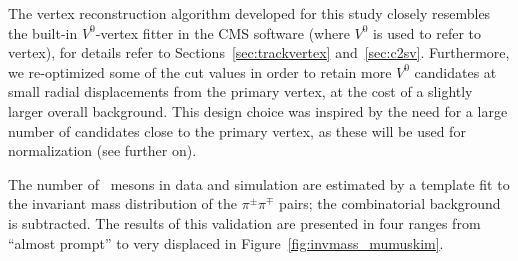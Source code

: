 The vertex reconstruction algorithm developed for this study closely
resembles the built-in $V^0$-vertex fitter in the CMS software (where
$V^0$ is used to refer to \PKzS vertex), for details refer to
Sections~\ref{sec:trackvertex} and~\ref{sec:c2sv}.
Furthermore, we re-optimized some of the cut
values in order to retain more $V^0$ candidates at small radial
displacements from the primary vertex, at the cost of a slightly
larger overall background. This design choice was inspired by the need
for a large number of candidates close to the primary vertex, as these
will be used for normalization (see further on). 

The number of \PKzS~mesons in data and simulation
are estimated by a template fit to the invariant mass distribution of the $\pi^{\pm}\pi^{\mp}$
pairs; the combinatorial background is subtracted. The results of this
validation are presented in four \Deltwod ranges
from ``almost prompt'' to very displaced in Figure~\ref{fig:invmass_mumuskim}.

